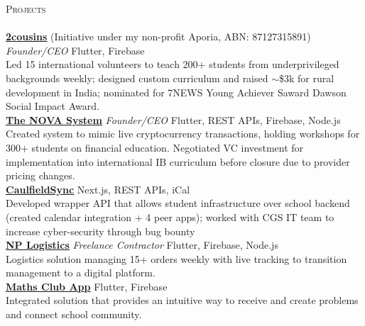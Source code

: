 \documentclass[a4paper]{article}
\newcommand{\lineunder} {
    \vspace*{-8pt} \\
    \hspace*{-10pt} \hrulefill \\
}
\newcommand{\header} [1] {
    {\hspace*{-10pt}\vspace*{6pt} \textsc{#1}}
    \vspace*{-6pt} \lineunder
}
\begin{document}
\header{Projects}
\href{https://2cousins.org/}{\textbf{\ul{2cousins}}} (Initiative under my non-profit Aporia, ABN: 87127315891) \textit{Founder/CEO} {\textsl{\hfill} Flutter, Firebase}\\
Led 15 international volunteers to teach 200+ students from underprivileged backgrounds weekly; designed custom curriculum and raised $\sim$\$3k for rural development in India; nominated for 7NEWS Young Achiever Saward Dawson Social Impact Award.\\
\vspace*{1.5mm}
\href{https://the-nova-system.github.io/}{\textbf{\ul{The NOVA System}}} \textit{Founder/CEO} {\textsl{\hfill} Flutter, REST APIs, Firebase, Node.js}\\
Created system to mimic live cryptocurrency transactions, holding workshops for 300+ students on financial education.
Negotiated VC investment for implementation into international IB curriculum before closure due to provider pricing changes.\\
\vspace*{1.5mm}
\href{https://caulfieldsync.vercel.app/}{\textbf{\ul{CaulfieldSync}}} {\textsl{\hfill} Next.js, REST APIs, iCal}\\
Developed wrapper API that allows student infrastructure over school backend (created calendar integration + 4 peer apps); worked with CGS IT team to increase cyber-security through bug bounty\\
\vspace*{1.5mm}
\href{https://nplogistics.com.au}{\textbf{\ul{NP Logistics}}} \textit{Freelance Contractor} {\textsl{\hfill} Flutter, Firebase, Node.js}\\
Logistics solution managing 15+ orders weekly with live tracking to transition management to a digital platform.\\
\vspace*{1.5mm}
\href{https://github.com/cgs-math/app}{\textbf{\ul{Maths Club App}}} {\textsl{\hfill} Flutter, Firebase}\\
Integrated solution that provides an intuitive way to receive and create problems and connect school community.\\
\vspace*{1.5mm}

\end{document}
